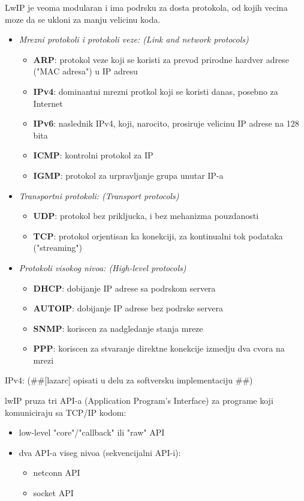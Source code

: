 \documentclass[a4paper,12pt, master]{etf}
\begin{document}
	LwIP je veoma modularan i ima podrsku za dosta protokola, od kojih vecina moze da se ukloni za
	manju velicinu koda.
	\begin{itemize}
		\item \textit{Mrezni protokoli i protokoli veze: (Link and network protocols)}
		\begin{itemize}
			\item \textbf{ARP}: protokol veze koji se koristi za prevod prirodne hardver adrese
			("MAC adresa") u IP adresu
			\item \textbf{IPv4}: dominantni mrezni protkol koji se koristi danas, posebno za
			Internet
			\item \textbf{IPv6}: naslednik IPv4, koji, narocito, prosiruje velicinu IP adrese na
			128 bita
			\item \textbf{ICMP}: kontrolni protokol za IP
			\item \textbf{IGMP}: protokol za urpravljanje grupa unutar IP-a
		\end{itemize}
		\item \textit{Transportni protokoli: (Transport protocols)}
			\begin{itemize}
				\item \textbf{UDP}: protokol bez prikljucka, i bez mehanizma pouzdanosti
				\item \textbf{TCP}: protokol orjentisan ka konekciji, za kontinualni tok podataka
				("streaming")
			\end{itemize}
		\item \textit{Protokoli visokog nivoa: (High-level protocols)}
			\begin{itemize}
				\item \textbf{DHCP}: dobijanje IP adrese sa podrskom servera
				\item \textbf{AUTOIP}: dobijanje IP adrese bez podrske servera
				\item \textbf{SNMP}: koriscen za nadgledanje stanja mreze
				\item \textbf{PPP}: koriscen za stvaranje direktne konekcije izmedju dva cvora na
				mrezi
			\end{itemize}
	\end{itemize}

	IPv4: (\#\#[lazarc] opisati u delu za softversku implementaciju \#\#)

	lwIP pruza tri API-a (Application Program's Interface) za programe koji komuniciraju sa TCP/IP
	kodom:
	\begin{itemize}
		\item low-level "core"/"callback" ili "raw" API
		\item dva API-a viseg nivoa (sekvencijalni API-i):
			\begin{itemize}
				\item netconn API
				\item socket API
			\end{itemize}
	\end{itemize}
\end{document}
